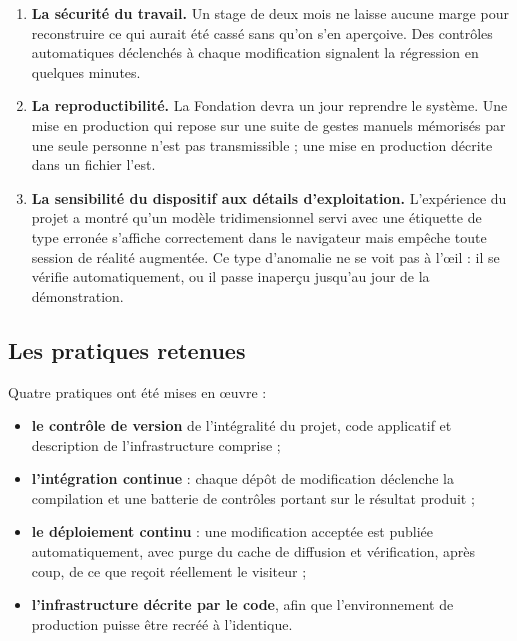 \begin{enumerate}
  \item \textbf{La sécurité du travail.} Un stage de deux mois ne laisse aucune
        marge pour reconstruire ce qui aurait été cassé sans qu'on s'en
        aperçoive. Des contrôles automatiques déclenchés à chaque modification
        signalent la régression en quelques minutes.

  \item \textbf{La reproductibilité.} La Fondation devra un jour reprendre le
        système. Une mise en production qui repose sur une suite de gestes
        manuels mémorisés par une seule personne n'est pas transmissible ; une
        mise en production décrite dans un fichier l'est.

  \item \textbf{La sensibilité du dispositif aux détails d'exploitation.}
        L'expérience du projet a montré qu'un modèle tridimensionnel servi avec
        une étiquette de type erronée s'affiche correctement dans le navigateur
        mais empêche toute session de réalité augmentée. Ce type d'anomalie ne
        se voit pas à l'œil : il se vérifie automatiquement, ou il passe
        inaperçu jusqu'au jour de la démonstration.
\end{enumerate}

\subsection{Les pratiques retenues}

Quatre pratiques ont été mises en œuvre :

\begin{itemize}
  \item \textbf{le contrôle de version} de l'intégralité du projet, code
        applicatif et description de l'infrastructure comprise ;
  \item \textbf{l'intégration continue} : chaque dépôt de modification déclenche
        la compilation et une batterie de contrôles portant sur le résultat
        produit ;
  \item \textbf{le déploiement continu} : une modification acceptée est publiée
        automatiquement, avec purge du cache de diffusion et vérification, après
        coup, de ce que reçoit réellement le visiteur ;
  \item \textbf{l'infrastructure décrite par le code}, afin que l'environnement
        de production puisse être recréé à l'identique.
\end{itemize}

